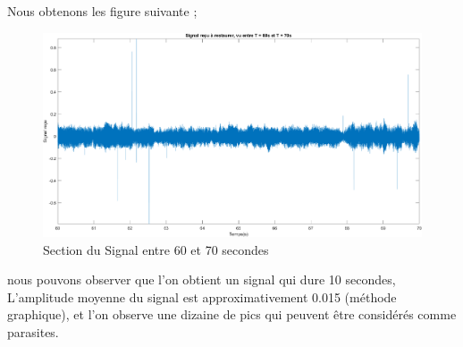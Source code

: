 \documentclass{article}
\begin{document}
Nous obtenons les figure suivante ; 
\begin{figure}[!h] 	
    \centering
    \includegraphics[width=1\textwidth]{images/signaloriginecourt.png}
    \caption{Section du Signal entre 60 et 70 secondes}
    \label{fig-binaire}
\end{figure}
nous pouvons observer que l'on obtient un signal qui dure 10 secondes, L'amplitude moyenne du signal est approximativement 0.015 (méthode graphique), et l'on observe une dizaine de pics qui peuvent être considérés comme parasites. \\
\end{document}
